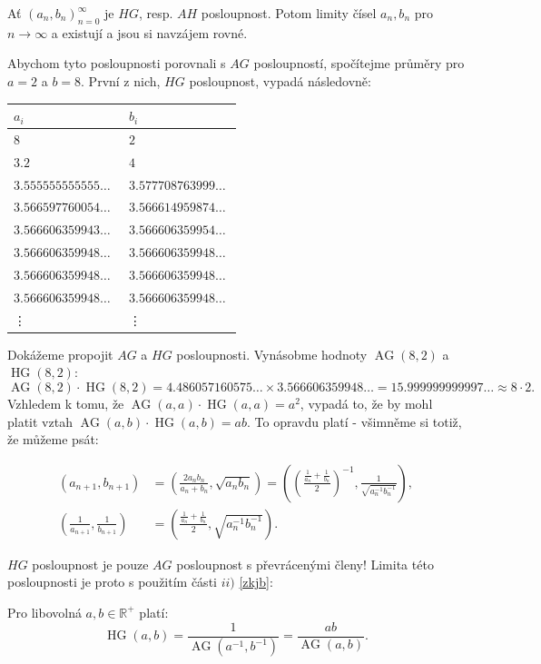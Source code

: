 \documentclass[12pt]{report}
\DeclareMathOperator{\AG}{AG}
\DeclareMathOperator{\HG}{HG}
\begin{document}
\begin{veta}
Ať $(a_n,b_n)_{n=0}^{\infty}$ je $HG$, resp. $AH$ posloupnost. Potom limity čísel $a_n,b_n$ pro $n \rightarrow \infty$ a existují a jsou si navzájem rovné.
\end{veta}

 Abychom tyto posloupnosti porovnali s $AG$ posloupností, spočítejme průměry pro $a=2$ a $b=8$. První z nich, $HG$ posloupnost, vypadá následovně:
\begin{longtable}[H]{>{\raggedright\arraybackslash}p{0.3\linewidth}p{0.202\linewidth}}
\toprule
$a_i$ & $b_i$\\
\midrule
$8$ & \noindent $2$\\
$3.2$ & \noindent $4$\\
$3.555555555555\dots$ & $3.577708763999\dots$\\
$3.566597760054\dots$ & $3.566614959874\dots$\\
$3.566606359943\dots$ & $3.566606359954\dots$\\ 
$3.566606359948\dots$ & $3.566606359948\dots$\\
$3.566606359948\dots$ & $3.566606359948\dots$\\
$3.566606359948\dots$ & $3.566606359948\dots$\\
\vdots & \vdots\\
\bottomrule 
\end{longtable} 
Dokážeme propojit $AG$ a $HG$ posloupnosti. Vynásobme hodnoty $\AG(8,2)$ a $\HG(8,2)$:
$$\AG(8,2) \cdot \HG(8,2) = 4.486057160575\dots \times 3.566606359948\dots = 15.999999999997\dots \approx 8 \cdot 2.$$
Vzhledem k tomu, že $\AG(a,a) \cdot \HG(a,a) = a^2$, vypadá to, že by mohl platit vztah $\AG(a,b) \cdot \HG(a,b) = ab$. To opravdu platí - všimněme si totiž, že můžeme psát:

\begin{align*}
\left(a_{n+1}, b_{n+1} \right) &= \left( \frac{2 a_n b_n}{a_n + b_n}, \sqrt{a_n b_n} \right) = \left( \left(\frac{\frac{1}{a_n}+ \frac{1}{b_n}}{2} \right)^{-1},\frac{1}{ \sqrt{a_n ^{-1} b_n ^{-1}}}  \right),\\
\left(\frac{1}{a_{n+1}}, \frac{1}{b_{n+1}} \right) &= \left(\frac{\frac{1}{a_n}+ \frac{1}{b_n}}{2} , \sqrt{a_n ^{-1} b_n ^{-1}}  \right).
\end{align*}

$HG$ posloupnost je pouze $AG$ posloupnost s převrácenými členy! Limita této posloupnosti je proto s použitím části $ii)$ \ref{zkjb}:
\begin{veta}\label{agh}
Pro libovolná $a,b \in \mathbb{R}^{+}$ platí:
$$\HG(a,b) = \frac{1}{\AG(a^{-1},b^{-1})} = \frac{ab}{\AG(a,b)}.$$
\end{veta}
\end{document}
